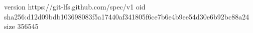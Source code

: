 version https://git-lfs.github.com/spec/v1
oid sha256:d12d09bdb103698083f5a17440af341805f6ce7b6e4b9ee54d30e6b92bc88a24
size 356545
